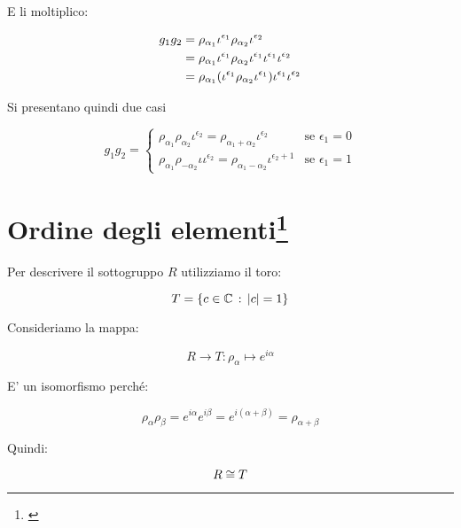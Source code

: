 E li moltiplico:

\begin{align}
	g_1g_2 
	& = \rho_{\alpha_1} \iota^{\epsilon_1} \rho_{\alpha_2} \iota^{\epsilon_2} \notag \\
	& = \rho_{\alpha_1} \iota^{\epsilon_1} \rho_{\alpha_2}  \iota^{\epsilon_1}  \iota^{\epsilon_1} \iota^{\epsilon_2} \notag \\
	& = \rho_{\alpha_1} (\iota^{\epsilon_1} \rho_{\alpha_2}  \iota^{\epsilon_1})  \iota^{\epsilon_1} \iota^{\epsilon_2} \notag 
\end{align}

Si presentano quindi due casi

\begin{equation}
	g_1g_2 =
	\begin{cases}
		\rho_{\alpha_1} \rho_{\alpha_2} \iota^{\epsilon_2} = \rho_{\alpha_1 + \alpha_2} \iota^{\epsilon_2} & \text{se } \epsilon_1 = 0 \\
		\rho_{\alpha_1} \rho_{-\alpha_2} \iota \iota^{\epsilon_2} = \rho_{\alpha_1 - \alpha_2} \iota^{\epsilon_2 + 1} & \text{se } \epsilon_1 = 1 		
	\end{cases}
\end{equation}

\section[Ordine degli elementi]{Ordine degli elementi\protect\footnote{\cite[7 novembre 2021]{lucchini}}}

Per descrivere il sottogruppo $R$ utilizziamo il toro:

\begin{equation}
	T = \{c \in \mathbb{C} \,:\, \lvert c \rvert = 1\}
\end{equation}

Consideriamo la mappa:

\begin{equation}
	R \longrightarrow T: \rho_\alpha \longmapsto e^{i\alpha}
\end{equation}

E' un isomorfismo perché:

\begin{equation}
	\rho_\alpha \rho_\beta = e^{i\alpha} e^{i\beta} = e^{i(\alpha + \beta)} = \rho_{\alpha + \beta}
\end{equation}

Quindi:

\begin{equation}
	R \cong T
\end{equation}

